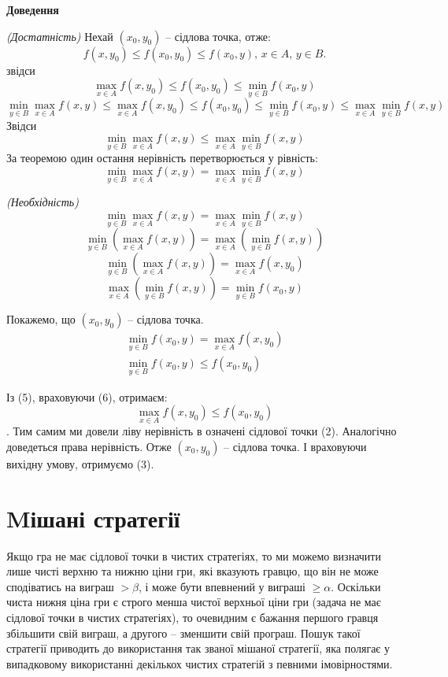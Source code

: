 \documentclass[12pt,a4paper]{book}
\begin{document}
{\bf Доведення}

\emph{(Достатність)} Нехай $(x_0, y_0)$ -- сідлова точка, отже:
\[
f(x, y_0) \le f(x_0, y_0) \le f(x_0, y),\, x \in A,\, y \in B.
\]
звідси
\begin{equation}
\max_{x \in A} f(x, y_0) \le f(x_0, y_0) \le \min_{y \in B} f(x_0, y)
\end{equation}
\[
\min_{y \in B} \max_{x \in A} f(x, y) \le \max_{x \in A} f(x, y_0) \le f(x_0, y_0) \le \min_{y \in B} f(x_0, y) \le \max_{x \in A}  \min_{y \in B} f(x, y)
\]
Звідси
\[
\min_{y \in B} \max_{x \in A} f(x, y)  \le \max_{x \in A}  \min_{y \in B} f(x, y)
\]
За теоремою один остання нерівність перетворюється у рівність:
\[
\min_{y \in B} \max_{x \in A} f(x, y)  = \max_{x \in A}  \min_{y \in B} f(x, y)
\]

\emph{(Необхідність)}
\[\min_{y \in B} \max_{x \in A} f(x, y)  = \max_{x \in A}  \min_{y \in B} f(x, y)\]
\[\min_{y \in B} \left(\max_{x \in A} f(x, y)\right)  = \max_{x \in A}  \left(\min_{y \in B} f(x, y)\right)\]
\[\min_{y \in B} \left(\max_{x \in A} f(x, y)\right)  = \max_{x \in A} f(x, y_0)\]
\[\max_{x \in A} \left(\min_{y \in B} f(x, y)\right)= \min_{y \in B} f(x_0, y)\]

Покажемо, що $(x_0, y_0)$ -- сідлова точка.
\begin{eqnarray}
\min_{y \in B} f(x_0, y)=\max_{x \in A} f(x, y_0)\\
\min_{y \in B} f(x_0, y) \le f(x_0, y_0)
\end{eqnarray}

Із (5), враховуючи (6), отримаєм:
\[\max_{x \in A} f(x, y_0) \le f(x_0, y_0) \]. Тим самим ми довели ліву нерівність в означені сідлової точки (2). Аналогічно доведеться права нерівність. Отже $(x_0, y_0)$ -- сідлова точка. І враховуючи вихідну умову, отримуємо (3).

\section{Mішані стратегії}

Якщо гра не має сідлової точки в чистих стратегіях, то ми можемо визначити лише чисті верхню та нижню ціни гри, які вказують гравцю, що він не може сподіватись на виграш $> \beta$, і може бути впевнений у виграші $\ge \alpha$. Оскільки чиста нижня ціна гри є строго менша чистої верхньої ціни гри (задача не має сідлової точки в чистих стратегіях), то очевидним є бажання першого гравця збільшити свій виграш, а другого -- зменшити свій програш. Пошук такої стратегії приводить до використання так званої мішаної стратегії, яка полягає у випадковому використанні декількох чистих стратегій з певними імовірностями.
\end{document}
